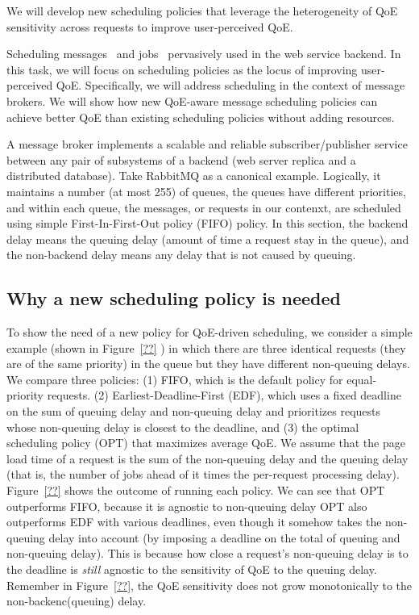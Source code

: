 \begin{task}
We will develop new scheduling policies that leverage the heterogeneity of QoE sensitivity across requests to improve user-perceived QoE.
\end{task}

Scheduling messages~\cite{??} and jobs~\cite{??} pervasively used in the web service backend. 
In this task, we will focus on scheduling policies as the locus of improving user-perceived QoE.
Specifically, we will address scheduling in the context of message brokers.
We will show how new QoE-aware message scheduling policies can achieve better QoE than existing scheduling policies without adding resources.

A message broker implements a scalable and reliable subscriber/publisher service between any pair of subsystems of a backend (\eg web server replica and a distributed database). 
Take RabbitMQ as a canonical example. 
Logically, it maintains a number (at most 255) of queues, the queues have different priorities, and within each queue, the messages, or requests in our contenxt, are scheduled using simple First-In-First-Out policy (FIFO) policy.
In this section, the backend delay means the queuing delay (amount of time a request stay in the queue), and the non-backend delay means any delay that is not caused by queuing.

\subsection{Why a new scheduling policy is needed}

To show the need of a new policy for QoE-driven  scheduling, we consider a simple example (shown in Figure~\ref{??} ) in which there are three identical requests (\ie they are of the same priority) in the queue but they have different non-queuing delays.
We compare three policies: 
(1) FIFO, which is the default policy for equal-priority requests.
(2) Earliest-Deadline-First (EDF), which uses a fixed deadline on the sum of queuing delay and non-queuing delay and prioritizes requests whose non-queuing delay is closest to the deadline, and 
(3) the optimal scheduling policy (OPT) that maximizes average QoE.
We assume that the page load time of a request is the sum of the non-queuing delay and the queuing delay (that is, the number of jobs ahead of it times the per-request processing delay).
Figure~\ref{??}  shows the outcome of running each policy. 
We can see that OPT outperforms FIFO, because it is agnostic to non-queuing delay
OPT also outperforms EDF with various deadlines, even though it somehow takes the non-queuing delay into account (by imposing a deadline on the total of queuing and non-queuing delay).
This is because how close a request's non-queuing delay is to the deadline is {\em still} agnostic to the sensitivity of QoE to the queuing delay. 
Remember in Figure~\ref{??}, the QoE sensitivity does not grow monotonically to the non-backenc(queuing) delay. 

